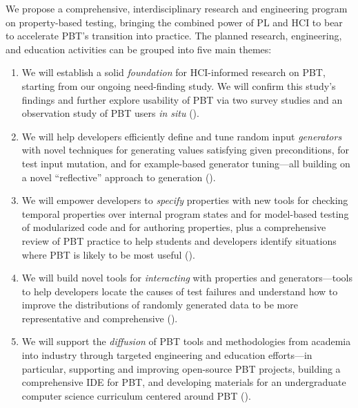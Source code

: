 We propose a comprehensive, interdisciplinary research and
engineering program on
{property-based testing}, bringing the combined power of PL and HCI to
bear to accelerate PBT's
transition into practice.  The planned research,
engineering, and education activities can be grouped into five main
themes: 
\begin{enumerate}[noitemsep]
\item We will establish a solid \emph{foundation} for HCI-informed research on PBT,
starting from our ongoing need-finding study. We will confirm
this study's findings and further explore usability of PBT via
two survey studies and an observation study
of PBT users {\em in situ} ().
%
\item We will help developers efficiently define and tune random input
\emph{generators} with novel techniques for generating values
satisfying given preconditions, for test input mutation, and for
example-based generator tuning---all building on a novel
``reflective'' approach to generation ().
%
\item We will empower developers to \emph{specify} properties with new
tools for checking temporal properties over internal program states
and for model-based testing of modularized code and for authoring
properties, plus a comprehensive review of PBT practice to help
students and developers identify situations where PBT is likely to be
most useful ().
%
\item We will build novel tools for {\em interacting} with properties
and generators---tools to help developers locate the causes of test
failures and understand how to improve the distributions of randomly
generated data to be more representative and
comprehensive\iflater{}\fi{} ().
%
\item We will support the {\em diffusion} of PBT tools and
methodologies from academia into industry through targeted engineering
and education efforts---in particular, supporting and
improving open-source PBT projects, building a
comprehensive IDE for PBT, and developing materials for an
undergraduate computer science curriculum centered around PBT
().
\end{enumerate}
